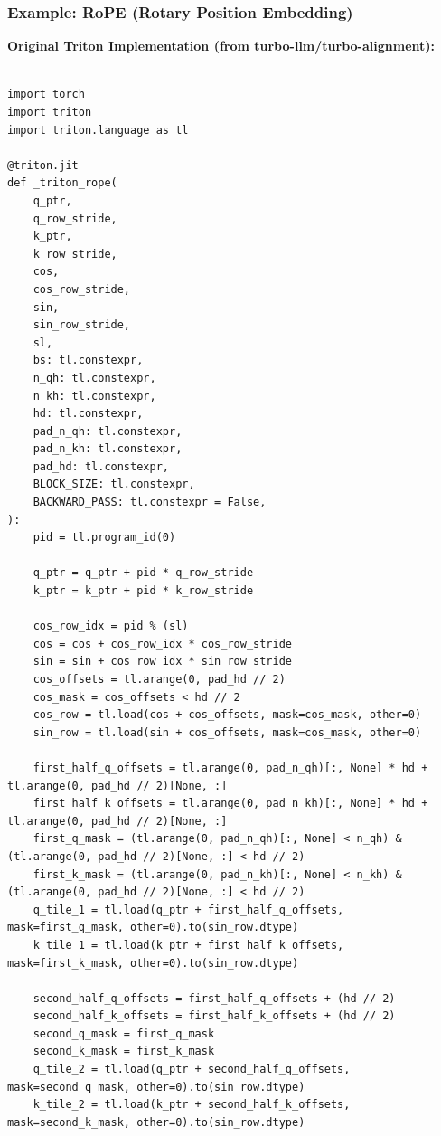 \subsubsection{Example: RoPE (Rotary Position Embedding)}

\textbf{Original Triton Implementation (from turbo-llm/turbo-alignment):}
\begin{mdframed}[linewidth=1pt, linecolor=black, backgroundcolor=gray!5]
\begin{lstlisting}

import torch
import triton
import triton.language as tl

@triton.jit
def _triton_rope(
    q_ptr,
    q_row_stride,
    k_ptr,
    k_row_stride,
    cos,
    cos_row_stride,
    sin,
    sin_row_stride,
    sl,
    bs: tl.constexpr,
    n_qh: tl.constexpr,
    n_kh: tl.constexpr,
    hd: tl.constexpr,
    pad_n_qh: tl.constexpr,
    pad_n_kh: tl.constexpr,
    pad_hd: tl.constexpr,
    BLOCK_SIZE: tl.constexpr,
    BACKWARD_PASS: tl.constexpr = False,
):
    pid = tl.program_id(0)

    q_ptr = q_ptr + pid * q_row_stride
    k_ptr = k_ptr + pid * k_row_stride

    cos_row_idx = pid % (sl)
    cos = cos + cos_row_idx * cos_row_stride
    sin = sin + cos_row_idx * sin_row_stride
    cos_offsets = tl.arange(0, pad_hd // 2)
    cos_mask = cos_offsets < hd // 2
    cos_row = tl.load(cos + cos_offsets, mask=cos_mask, other=0)
    sin_row = tl.load(sin + cos_offsets, mask=cos_mask, other=0)

    first_half_q_offsets = tl.arange(0, pad_n_qh)[:, None] * hd + tl.arange(0, pad_hd // 2)[None, :]
    first_half_k_offsets = tl.arange(0, pad_n_kh)[:, None] * hd + tl.arange(0, pad_hd // 2)[None, :]
    first_q_mask = (tl.arange(0, pad_n_qh)[:, None] < n_qh) & (tl.arange(0, pad_hd // 2)[None, :] < hd // 2)
    first_k_mask = (tl.arange(0, pad_n_kh)[:, None] < n_kh) & (tl.arange(0, pad_hd // 2)[None, :] < hd // 2)
    q_tile_1 = tl.load(q_ptr + first_half_q_offsets, mask=first_q_mask, other=0).to(sin_row.dtype)
    k_tile_1 = tl.load(k_ptr + first_half_k_offsets, mask=first_k_mask, other=0).to(sin_row.dtype)

    second_half_q_offsets = first_half_q_offsets + (hd // 2)
    second_half_k_offsets = first_half_k_offsets + (hd // 2)
    second_q_mask = first_q_mask
    second_k_mask = first_k_mask
    q_tile_2 = tl.load(q_ptr + second_half_q_offsets, mask=second_q_mask, other=0).to(sin_row.dtype)
    k_tile_2 = tl.load(k_ptr + second_half_k_offsets, mask=second_k_mask, other=0).to(sin_row.dtype)


\end{lstlisting}
\end{mdframed}
